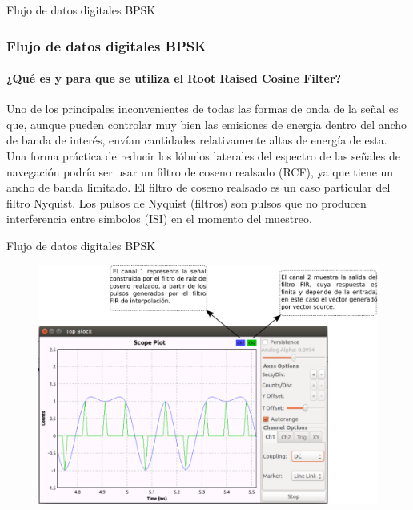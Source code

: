 \begin{frame}{Flujo de datos digitales BPSK}
\frametitle{Flujo de datos digitales BPSK}
\framesubtitle{¿Qué es y para que se utiliza el Root Raised Cosine Filter?}
\justifying
Uno de los principales inconvenientes de todas las formas de onda de la señal es que, aunque pueden controlar muy bien las emisiones de energía dentro del ancho de banda de interés, envían cantidades relativamente altas de energía de esta. Una forma práctica de reducir los lóbulos laterales del espectro de las señales de navegación podría ser usar un filtro de coseno realsado (RCF), ya que tiene un ancho de banda limitado. El filtro de coseno realsado es un caso particular del filtro Nyquist. Los pulsos de Nyquist (filtros) son pulsos que no producen interferencia entre símbolos (ISI) en el momento del muestreo.\cite{Navipedia 2011}
\end{frame}
\begin{frame}{Flujo de datos digitales BPSK}
\begin{figure}
\includegraphics[width=.9\textwidth]{parte1/lab5/pdf/lab5_4.pdf}
\end{figure}
\end{frame}
